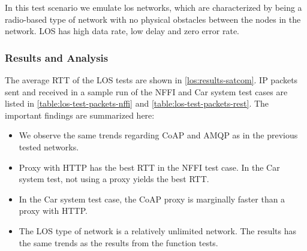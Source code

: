 In this test scenario we emulate \gls{los} networks, which are characterized by
being a radio-based type of network with no physical obstacles between the nodes
in the network. LOS has high data rate, low delay and zero error rate.

\subsubsection{Results and Analysis}

The average RTT of the LOS tests are shown in \cref{los:results-satcom}. IP
packets sent and received in a sample run of the NFFI and Car system test cases
are listed in \cref{table:los-test-packets-nffi} and
\cref{table:los-test-packets-rest}. The important findings are summarized here:

\begin{itemize}

    \item We observe the same trends regarding CoAP and AMQP as in the previous
    tested networks.

    \item Proxy with HTTP has the best RTT in the NFFI test case. In the Car
    system test, not using a proxy yields the best RTT.

    \item In the Car system test case, the CoAP proxy is marginally faster than a
    proxy with HTTP.

    \item The LOS type of network is a relatively unlimited network. The results
    has the same trends as the results from the function tests.

\end{itemize}



